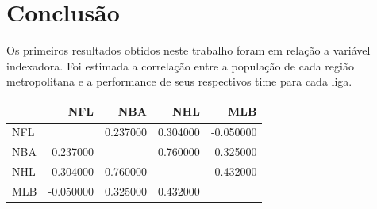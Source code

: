 \documentclass[12pt,oneside,a4paper,chapter=TITLE,english,brazil,sumario=abnt-6027-2012]{abntex2}
\begin{document}
	
\chapter{Conclusão}

	Os primeiros resultados obtidos neste trabalho foram em relação a variável indexadora. Foi estimada a correlação entre a população de cada região metropolitana e a performance de seus respectivos time para cada liga. 
	

	\begin{table}[H]
	\centering
	\begin{tabular}{lrrrr}
	& NFL & NBA & NHL & MLB \\\hline
	NFL &  & 0.237000 & 0.304000 & -0.050000 \\\hline
	NBA & 0.237000 &  & 0.760000 & 0.325000 \\\hline
	NHL & 0.304000 & 0.760000 &  & 0.432000 \\\hline
	MLB & -0.050000 & 0.325000 & 0.432000 &  \\\hline
	\end{tabular}
	\end{table}	

	
	
	
\end{document}
